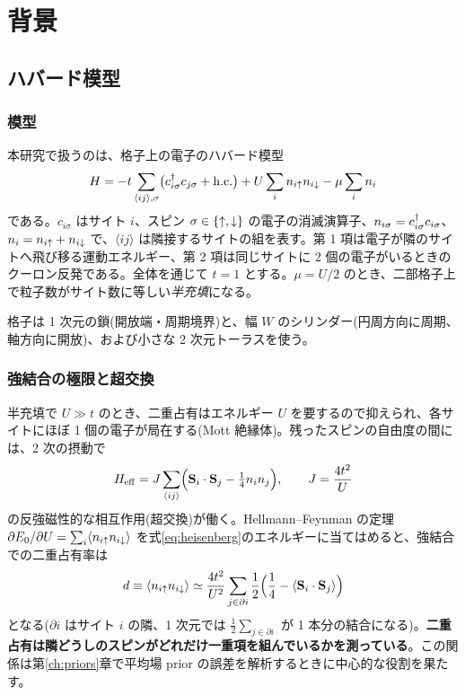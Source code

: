 \chapter{背景}
\label{ch:background}

\section{ハバード模型}
\label{sec:hubbard}

\subsection{模型}
本研究で扱うのは、格子上の電子のハバード模型\cite{hubbard1963}
\begin{equation}
  H=-t\sum_{\langle ij\rangle,\sigma}\bigl(c^\dagger_{i\sigma}c_{j\sigma}+\mathrm{h.c.}\bigr)+U\sum_i n_{i\uparrow}n_{i\downarrow}-\mu\sum_{i}n_i
  \label{eq:hubbard}
\end{equation}
である。$c_{i\sigma}$ はサイト $i$、スピン $\sigma\in\{\uparrow,\downarrow\}$ の電子の消滅演算子、$n_{i\sigma}=c^\dagger_{i\sigma}c_{i\sigma}$、$n_i=n_{i\uparrow}+n_{i\downarrow}$ で、$\langle ij\rangle$ は隣接するサイトの組を表す。第 1 項は電子が隣のサイトへ飛び移る運動エネルギー、第 2 項は同じサイトに 2 個の電子がいるときのクーロン反発である。全体を通じて $t=1$ とする。$\mu=U/2$ のとき、二部格子上で粒子数がサイト数に等しい\emph{半充填}になる。

格子は 1 次元の鎖(開放端・周期境界)と、幅 $W$ のシリンダー(円周方向に周期、軸方向に開放)、および小さな 2 次元トーラスを使う。

\subsection{強結合の極限と超交換}
半充填で $U\gg t$ のとき、二重占有はエネルギー $U$ を要するので抑えられ、各サイトにほぼ 1 個の電子が局在する(Mott 絶縁体)。残ったスピンの自由度の間には、2 次の摂動で
\begin{equation}
  H_{\rm eff}=J\sum_{\langle ij\rangle}\Bigl(\mathbf S_i\cdot\mathbf S_j-\tfrac14n_in_j\Bigr),\qquad J=\frac{4t^2}{U}
  \label{eq:heisenberg}
\end{equation}
の反強磁性的な相互作用(超交換\cite{anderson1959})が働く。Hellmann--Feynman の定理 $\partial E_0/\partial U=\sum_i\langle n_{i\uparrow}n_{i\downarrow}\rangle$ を式\eqref{eq:heisenberg}のエネルギーに当てはめると、強結合での二重占有率は
\begin{equation}
  d\equiv\langle n_{i\uparrow}n_{i\downarrow}\rangle\simeq\frac{4t^2}{U^2}\sum_{j\in\partial i}\frac12\Bigl(\frac14-\langle \mathbf S_i\cdot\mathbf S_j\rangle\Bigr)
  \label{eq:d-strong}
\end{equation}
となる($\partial i$ はサイト $i$ の隣、1 次元では $\tfrac12\sum_{j\in\partial i}$ が 1 本分の結合になる)。\textbf{二重占有は隣どうしのスピンがどれだけ一重項を組んでいるかを測っている}。この関係は第\ref{ch:priors}章で平均場 prior の誤差を解析するときに中心的な役割を果たす。

